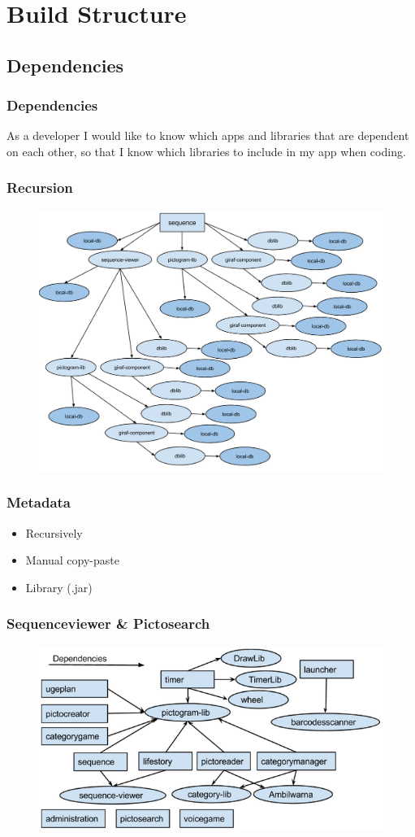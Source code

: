 \section{Build Structure}
\subsection{Dependencies}
\begin{frame}
	\frametitle{Dependencies}
	As a developer I would like to know which apps and libraries that are dependent on each other, so that I know which libraries to include in my app when coding.
\end{frame}
\begin{frame}
	\frametitle{Recursion}
	\begin{figure}[H]
			\centering
			\includegraphics[width= 0.8 \textwidth]{pictures/oldbuild.png}
	\end{figure}
\end{frame}
\begin{frame}
	\frametitle{Metadata}
		\begin{itemize}
			\item Recursively
			\item Manual copy-paste
			\item Library (.jar)			
		\end{itemize}
\end{frame}
\begin{frame}
	\frametitle{Sequenceviewer \& Pictosearch}
	\begin{figure}[H]
				\centering
				\includegraphics[width= 0.8 \textwidth]{pictures/AppLibependencies.png}
	\end{figure}
\end{frame}
